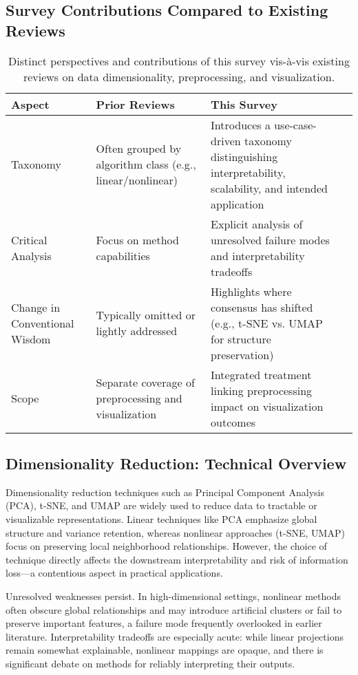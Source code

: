 \documentclass[sigconf]{acmart}
\begin{document}
\subsection*{Survey Contributions Compared to Existing Reviews}
\begin{table*}[htbp]
\centering
\caption{Distinct perspectives and contributions of this survey vis-à-vis existing reviews on data dimensionality, preprocessing, and visualization.}
\label{tab:distinct_contributions}
\begin{adjustbox}{max width=\textwidth}
\begin{tabular}{@{}llll@{}}
\toprule
Aspect & Prior Reviews & This Survey \\
\midrule
Taxonomy & Often grouped by algorithm class (e.g., linear/nonlinear) & Introduces a use-case-driven taxonomy distinguishing interpretability, scalability, and intended application \\
Critical Analysis & Focus on method capabilities & Explicit analysis of unresolved failure modes and interpretability tradeoffs \\
Change in Conventional Wisdom & Typically omitted or lightly addressed & Highlights where consensus has shifted (e.g., t-SNE vs. UMAP for structure preservation) \\
Scope & Separate coverage of preprocessing and visualization & Integrated treatment linking preprocessing impact on visualization outcomes \\
\bottomrule
\end{tabular}
\end{adjustbox}
\end{table*}

\subsection*{Dimensionality Reduction: Technical Overview}
Dimensionality reduction techniques such as Principal Component Analysis (PCA), t-SNE, and UMAP are widely used to reduce data to tractable or visualizable representations. Linear techniques like PCA emphasize global structure and variance retention, whereas nonlinear approaches (t-SNE, UMAP) focus on preserving local neighborhood relationships. However, the choice of technique directly affects the downstream interpretability and risk of information loss---a contentious aspect in practical applications.

Unresolved weaknesses persist. In high-dimensional settings, nonlinear methods often obscure global relationships and may introduce artificial clusters or fail to preserve important features, a failure mode frequently overlooked in earlier literature. Interpretability tradeoffs are especially acute: while linear projections remain somewhat explainable, nonlinear mappings are opaque, and there is significant debate on methods for reliably interpreting their outputs.
\end{document}
